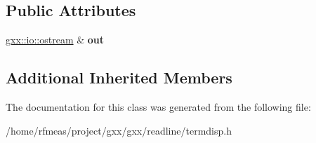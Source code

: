 \subsection*{Public Attributes}
\begin{DoxyCompactItemize}
\item 
\hyperlink{classgxx_1_1io_1_1ostream}{gxx\+::io\+::ostream} \& {\bfseries out}\hypertarget{classgxx_1_1termdisp__vt100_a453bbd58c84c16ee80eb75f47c01ac0d}{}\label{classgxx_1_1termdisp__vt100_a453bbd58c84c16ee80eb75f47c01ac0d}

\end{DoxyCompactItemize}
\subsection*{Additional Inherited Members}


The documentation for this class was generated from the following file\+:\begin{DoxyCompactItemize}
\item 
/home/rfmeas/project/gxx/gxx/readline/termdisp.\+h\end{DoxyCompactItemize}
